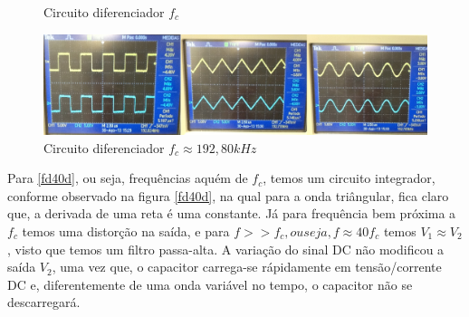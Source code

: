 \documentclass[12pt,letterpaper]{article}
\begin{document}
\begin{enumerate}[I]
\begin{figure}[!htb]
  \caption{Circuito diferenciador $f_c$}
\end{figure}
\begin{figure}[!htb]
  \centering
  \label{f40d}
  \includegraphics[scale=0.25]{img/f40d.jpg}
  \caption{Circuito diferenciador $f_c \approx 192,80kHz$}
\end{figure}
Para \ref{fd40d}, ou seja, frequências aquém de $f_c$, temos um circuito integrador, conforme observado na figura \ref{fd40d}, na qual para a onda triângular, fica claro que, a derivada de uma reta é uma constante. Já para frequência bem próxima a $f_c$ temos uma distorção na saída, e para $f >> f_c, ou seja, f \approx 40f_c$ temos $V_1 \approx V_2$, visto que temos um filtro passa-alta. 
A variação do sinal DC não modificou a saída $V_2$, uma vez que, o capacitor carrega-se rápidamente em tensão/corrente DC e, diferentemente de uma onda variável no tempo, o capacitor não se descarregará.
\end{enumerate}
\end{document}
